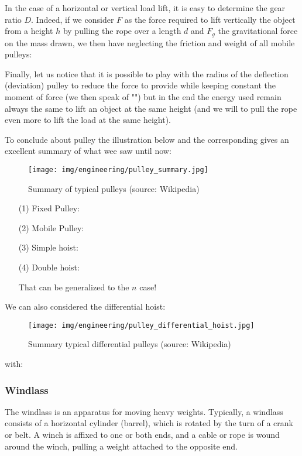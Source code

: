 	In the case of a horizontal or vertical load lift, it is easy to determine the gear ratio $D$. Indeed, if we consider $F$ as  the force required to lift vertically the object from a height $h$ by pulling the rope over a length $d$ and $F_g$ the gravitational force on the mass drawn, we then have neglecting the friction and weight of all mobile pulleys:
	
	Finally, let us notice that it is possible to play with the radius of the deflection (deviation) pulley to reduce the force to provide while keeping constant the moment of force (we then speak of "") but in the end the energy used remain always the same to lift an object at the same height (and we will to pull the rope even more to lift the load at the same height).
	
	\pagebreak
	To conclude about pulley the illustration below and the corresponding gives an excellent summary of what wee saw until now:
	\begin{figure}[H]
		\centering
		\texttt{[image: img/engineering/pulley\_summary.jpg]}
		\caption[Summary of typical pulleys]{Summary of typical pulleys (source: Wikipedia)}
	\end{figure}
	\begin{enumerate}
		\item[(1)] Fixed Pulley:
		
	
		\item[(2)] Mobile Pulley:
		
		
		\item[(3)] Simple hoist:
		

		\item[(4)] Double hoist:
		
		That can be generalized to the $n$ case!
	\end{enumerate}
	
	\pagebreak
	We can also considered the differential hoist:
	\begin{figure}[H]
		\centering
		\texttt{[image: img/engineering/pulley\_differential\_hoist.jpg]}
		\caption[Summary typical differential pulleys]{Summary typical differential pulleys (source: Wikipedia)}
	\end{figure}
	with:
	
	
	\subsubsection{Windlass}
	The windlass is an apparatus for moving heavy weights. Typically, a windlass consists of a horizontal cylinder (barrel), which is rotated by the turn of a crank or belt. A winch is affixed to one or both ends, and a cable or rope is wound around the winch, pulling a weight attached to the opposite end.
	
